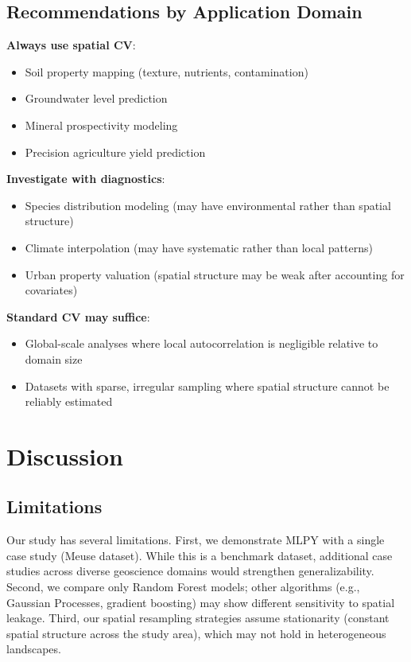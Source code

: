\documentclass[a4paper,fleqn]{cas-sc}
\begin{document}
\subsection{Recommendations by Application Domain}

\textbf{Always use spatial CV}:
\begin{itemize}
\item Soil property mapping (texture, nutrients, contamination)
\item Groundwater level prediction
\item Mineral prospectivity modeling
\item Precision agriculture yield prediction
\end{itemize}

\textbf{Investigate with diagnostics}:
\begin{itemize}
\item Species distribution modeling (may have environmental rather than spatial structure)
\item Climate interpolation (may have systematic rather than local patterns)
\item Urban property valuation (spatial structure may be weak after accounting for covariates)
\end{itemize}

\textbf{Standard CV may suffice}:
\begin{itemize}
\item Global-scale analyses where local autocorrelation is negligible relative to domain size
\item Datasets with sparse, irregular sampling where spatial structure cannot be reliably estimated
\end{itemize}


\section{Discussion}
\label{sec:discussion}

\subsection{Limitations}

Our study has several limitations. First, we demonstrate MLPY with a single case study (Meuse dataset). While this is a benchmark dataset, additional case studies across diverse geoscience domains would strengthen generalizability. Second, we compare only Random Forest models; other algorithms (e.g., Gaussian Processes, gradient boosting) may show different sensitivity to spatial leakage. Third, our spatial resampling strategies assume stationarity (constant spatial structure across the study area), which may not hold in heterogeneous landscapes.
\end{document}
